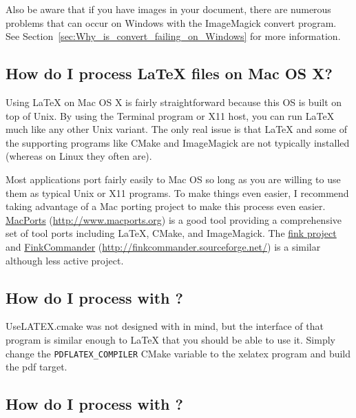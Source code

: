 \documentclass{article}
\newcommand*{\textfile}[1]{\textsf{#1}}
\newcommand*{\textprog}[1]{\textfile{#1}}
\newcommand*{\textcmake}[1]{\texttt{#1}}
\newcommand*{\textcmakevar}[1]{\textcmake{#1}}
\newcommand*{\textmaketarget}[1]{#1}
\newcommand*{\UseLATEX}{\textfile{UseLATEX.cmake}\xspace}
\newcommand*{\latex}{\LaTeX\xspace}
\newcommand*{\xelatex}{\Hologo{XeLaTeX}\xspace}
\newcommand*{\lualatex}{\Hologo{LuaLaTeX}\xspace}
\begin{document}
  Also be aware that if you have images in your document, there are
  numerous problems that can occur on Windows with the ImageMagick
  \textprog{convert} program. See
  Section~\ref{sec:Why_is_convert_failing_on_Windows} for more information.

  \subsection{How do I process \latex files on Mac OS X?}
  \label{sec:How_do_I_process_latex_files_on_Mac_OS_X}

  Using \latex on Mac OS X is fairly straightforward because this OS is
  built on top of Unix.  By using the Terminal program or X11 host, you can
  run \latex much like any other Unix variant.  The only real issue is that
  \latex and some of the supporting programs like CMake and ImageMagick are
  not typically installed (whereas on Linux they often are).

  Most applications port fairly easily to Mac OS so long as you are willing
  to use them as typical Unix or X11 programs.  To make things even easier,
  I recommend taking advantage of a Mac porting project to make this
  process even easier.  \href{http://www.macports.org}{MacPorts}
  (\href{http://www.macports.org}{http://www.macports.org}) is a good tool
  providing a comprehensive set of tool ports including \latex, CMake, and
  ImageMagick.  The \href{http://www.finkproject.org/}{fink project} and
  \href{http://finkcommander.sourceforge.net/}{FinkCommander}
  (\href{http://finkcommander.sourceforge.net/}{http://finkcommander.sourceforge.net/})
  is a similar although less active project.

  \subsection{How do I process with \xelatex?}
  \label{sec:How_do_I_process_with_XeLaTeX}

  \UseLATEX was not designed with \xelatex in mind, but the
  interface of that program is similar enough to \latex that you should be
  able to use it. Simply change the \textcmakevar{PDFLATEX\_COMPILER} CMake
  variable to the \textprog{xelatex} program and build the
  \textmaketarget{pdf} target.

  \subsection{How do I process with \lualatex?}
  \label{sec:How_do_I_process_with_LuaLaTeX}
\end{document}
